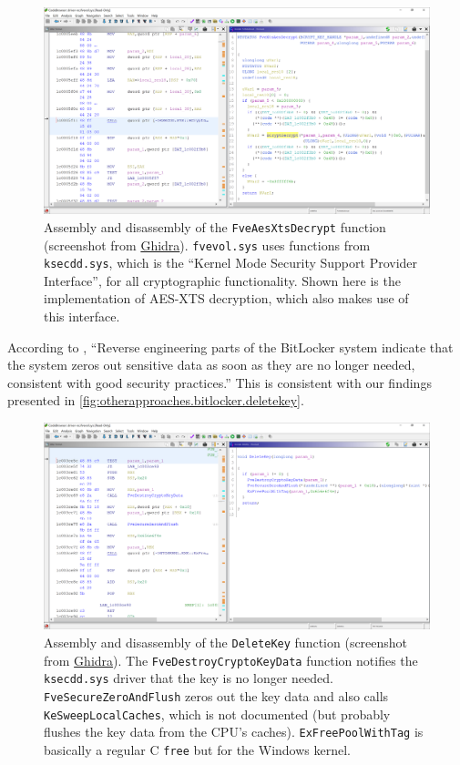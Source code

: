 \begin{figure}[htb!]
	\center
	\includegraphics[scale=0.39]{../img/otherapproaches.bitlocker.xtsdecrypt.png}
	\caption[
		Assembly and disassembly of the \texttt{FveAesXtsDecrypt} function
	]{
		Assembly and disassembly of the \texttt{FveAesXtsDecrypt} function (screenshot from \href{https://www.ghidra-sre.org}{Ghidra}). \texttt{fvevol.sys} uses functions from \texttt{ksecdd.sys}, which is the ``Kernel Mode Security Support Provider Interface'', for all cryptographic functionality. Shown here is the implementation of AES-XTS decryption, which also makes use of this interface.
	}
	\label{fig:otherapproaches.bitlocker.xtsdecrypt}
\end{figure}

According to \cite{Kornblum2009}, ``Reverse engineering parts of the BitLocker system indicate that the system zeros out sensitive data as soon as they are no longer needed, consistent with good security practices.'' This is consistent with our findings presented in \autoref{fig:otherapproaches.bitlocker.deletekey}.

\begin{figure}[htb!]
	\center
	\includegraphics[scale=0.39]{../img/otherapproaches.bitlocker.deletekey.png}
	\caption[
		Assembly and disassembly of the \texttt{DeleteKey} function
	]{
		Assembly and disassembly of the \texttt{DeleteKey} function (screenshot from \href{https://www.ghidra-sre.org}{Ghidra}). The \texttt{FveDestroyCryptoKeyData} function notifies the \texttt{ksecdd.sys} driver that the key is no longer needed. \texttt{FveSecureZeroAndFlush} zeros out the key data and also calls \texttt{KeSweepLocalCaches}, which is not documented (but probably flushes the key data from the CPU's caches). \texttt{ExFreePoolWithTag} is basically a regular C \texttt{free} but for the Windows kernel.
	}
	\label{fig:otherapproaches.bitlocker.deletekey}
\end{figure}